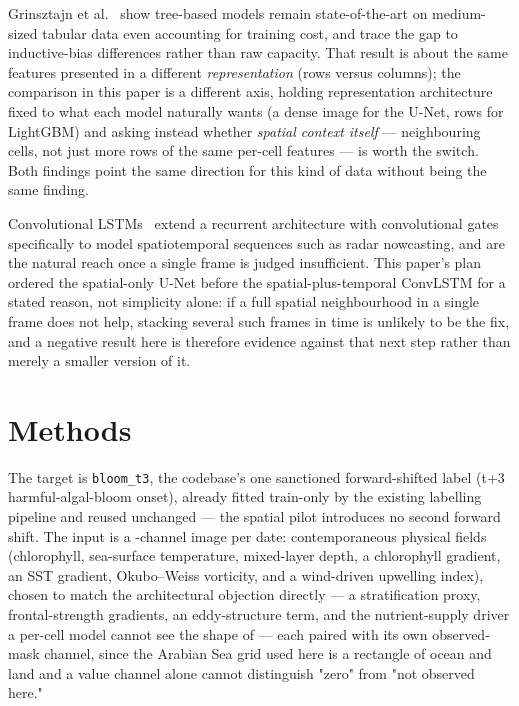 Grinsztajn et al.~\citep{grinsztajn2022} show tree-based models remain
state-of-the-art on medium-sized tabular data even accounting for training
cost, and trace the gap to inductive-bias differences rather than raw
capacity. That result is about the same features presented in a different
\emph{representation} (rows versus columns); the comparison in this paper is
a different axis, holding representation architecture fixed to what each
model naturally wants (a dense image for the U-Net, rows for LightGBM) and
asking instead whether \emph{spatial context itself} --- neighbouring cells,
not just more rows of the same per-cell features --- is worth the switch.
Both findings point the same direction for this kind of data without being
the same finding.

 Convolutional
LSTMs~\citep{shi2015} extend a recurrent architecture with convolutional
gates specifically to model spatiotemporal sequences such as radar
nowcasting, and are the natural reach once a single frame is judged
insufficient. This paper's plan ordered the spatial-only U-Net before the
spatial-plus-temporal ConvLSTM for a stated reason, not simplicity alone: if
a full spatial neighbourhood in a single frame does not help, stacking
several such frames in time is unlikely to be the fix, and a negative result
here is therefore evidence against that next step rather than merely a
smaller version of it.

\section{Methods}
\label{sec:methods}

 The target is \texttt{bloom\_t3}, the codebase's
one sanctioned forward-shifted label (t+3 harmful-algal-bloom onset),
already fitted train-only by the existing labelling pipeline and reused
unchanged --- the spatial pilot introduces no second forward shift. The
input is a \NInputChannels{}-channel image per date: \NChannels{}
contemporaneous physical fields (chlorophyll, sea-surface temperature,
mixed-layer depth, a chlorophyll gradient, an SST gradient, Okubo--Weiss
vorticity, and a wind-driven upwelling index), chosen to match the
architectural objection directly --- a stratification proxy, frontal-strength
gradients, an eddy-structure term, and the nutrient-supply driver a per-cell
model cannot see the shape of --- each paired with its own observed-mask
channel, since the Arabian Sea grid used here is a rectangle of ocean and
land and a value channel alone cannot distinguish "zero" from "not observed
here."

